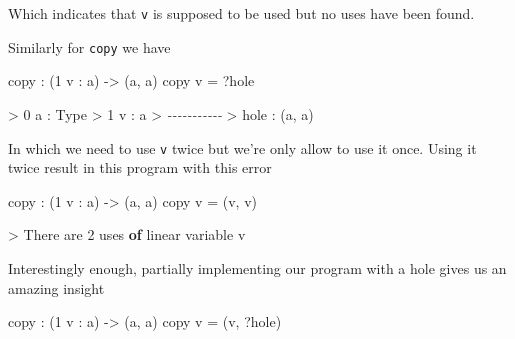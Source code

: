 \documentclass[
]{article}
\newenvironment{Shaded}{}{}
\newcommand{\CommentTok}[1]{\textcolor[rgb]{0.38,0.63,0.69}{\textit{#1}}}
\newcommand{\DataTypeTok}[1]{\textcolor[rgb]{0.56,0.13,0.00}{#1}}
\newcommand{\DecValTok}[1]{\textcolor[rgb]{0.25,0.63,0.44}{#1}}
\newcommand{\KeywordTok}[1]{\textcolor[rgb]{0.00,0.44,0.13}{\textbf{#1}}}
\newcommand{\NormalTok}[1]{#1}
\newcommand{\OperatorTok}[1]{\textcolor[rgb]{0.40,0.40,0.40}{#1}}
\newcommand{\OtherTok}[1]{\textcolor[rgb]{0.00,0.44,0.13}{#1}}
\begin{document}
Which indicates that \texttt{v} is supposed to be used but no uses have
been found.

Similarly for \texttt{copy} we have

\begin{Shaded}
\begin{Highlighting}[]
\NormalTok{copy }\OperatorTok{:}\NormalTok{ (}\DecValTok{1}\NormalTok{ v }\OperatorTok{:}\NormalTok{ a) }\OtherTok{{-}\textgreater{}}\NormalTok{ (a, a)}
\NormalTok{copy v }\OtherTok{=} \OperatorTok{?}\NormalTok{hole}
\end{Highlighting}
\end{Shaded}

\begin{Shaded}
\begin{Highlighting}[]
\OperatorTok{\textgreater{}} \DecValTok{0}\NormalTok{ a }\OperatorTok{:} \DataTypeTok{Type}
\OperatorTok{\textgreater{}} \DecValTok{1}\NormalTok{ v }\OperatorTok{:}\NormalTok{ a}
\OperatorTok{\textgreater{}} \CommentTok{{-}{-}{-}{-}{-}{-}{-}{-}{-}{-}{-}}
\OperatorTok{\textgreater{}}\NormalTok{ hole }\OperatorTok{:}\NormalTok{ (a, a)}
\end{Highlighting}
\end{Shaded}

In which we need to use \texttt{v} twice but we're only allow to use it
once. Using it twice result in this program with this error

\begin{Shaded}
\begin{Highlighting}[]
\NormalTok{copy }\OperatorTok{:}\NormalTok{ (}\DecValTok{1}\NormalTok{ v }\OperatorTok{:}\NormalTok{ a) }\OtherTok{{-}\textgreater{}}\NormalTok{ (a, a)}
\NormalTok{copy v }\OtherTok{=}\NormalTok{ (v, v)}
\end{Highlighting}
\end{Shaded}

\begin{Shaded}
\begin{Highlighting}[]
\OperatorTok{\textgreater{}} \DataTypeTok{There}\NormalTok{ are }\DecValTok{2}\NormalTok{ uses }\KeywordTok{of}\NormalTok{ linear variable v}
\end{Highlighting}
\end{Shaded}

Interestingly enough, partially implementing our program with a hole
gives us an amazing insight

\begin{Shaded}
\begin{Highlighting}[]
\NormalTok{copy }\OperatorTok{:}\NormalTok{ (}\DecValTok{1}\NormalTok{ v }\OperatorTok{:}\NormalTok{ a) }\OtherTok{{-}\textgreater{}}\NormalTok{ (a, a)}
\NormalTok{copy v }\OtherTok{=}\NormalTok{ (v, }\OperatorTok{?}\NormalTok{hole)}
\end{Highlighting}
\end{Shaded}
\end{document}
